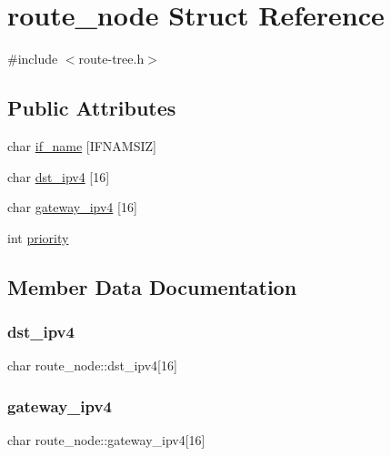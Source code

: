 \hypertarget{structroute__node}{}\section{route\+\_\+node Struct Reference}
\label{structroute__node}


{\ttfamily \#include $<$route-\/tree.\+h$>$}

\subsection*{Public Attributes}
\begin{DoxyCompactItemize}
\item 
char \hyperlink{structroute__node_a4be6a66a552d88f360585c636ee70680}{if\+\_\+name} \mbox{[}I\+F\+N\+A\+M\+S\+IZ\mbox{]}
\item 
char \hyperlink{structroute__node_a27a750349a740654f57ad08fe87ff83f}{dst\+\_\+ipv4} \mbox{[}16\mbox{]}
\item 
char \hyperlink{structroute__node_a17ee301a4563560e6b7262dff9c8c0b8}{gateway\+\_\+ipv4} \mbox{[}16\mbox{]}
\item 
int \hyperlink{structroute__node_a43cbb1b4e49fd4a12395fa28a9febecc}{priority}
\end{DoxyCompactItemize}


\subsection{Member Data Documentation}
\mbox{\label{structroute__node_a27a750349a740654f57ad08fe87ff83f}} 
\subsubsection{\texorpdfstring{dst\+\_\+ipv4}{dst\_ipv4}}
{\footnotesize\ttfamily char route\+\_\+node\+::dst\+\_\+ipv4\mbox{[}16\mbox{]}}

\mbox{\label{structroute__node_a17ee301a4563560e6b7262dff9c8c0b8}} 
\subsubsection{\texorpdfstring{gateway\+\_\+ipv4}{gateway\_ipv4}}
{\footnotesize\ttfamily char route\+\_\+node\+::gateway\+\_\+ipv4\mbox{[}16\mbox{]}}

